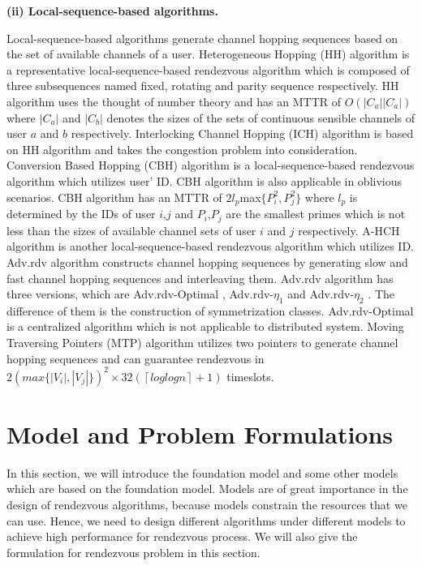 \documentclass[10pt, conference, letterpaper]{IEEEtran}
\begin{document}
\bfseries (ii) Local-sequence-based algorithms. \mdseries

Local-sequence-based algorithms generate channel hopping sequences based on the set of available channels of a user. Heterogeneous Hopping (HH)\cite{Shin2010A} algorithm is a representative local-sequence-based rendezvous algorithm which is composed of three subsequences named fixed, rotating and parity sequence respectively. HH algorithm uses the thought of number theory and has an MTTR of $O(|C_a||C_a|)$ where $|C_a|$ and $|C_b|$ denotes the sizes  of the sets of continuous sensible channels of user $a$ and $b$ respectively.  Interlocking Channel Hopping (ICH)\cite{Wu2013On} algorithm is based on HH algorithm and takes the congestion problem into consideration. Conversion Based Hopping (CBH)\cite{Gu2014Fully} algorithm is a local-sequence-based rendezvous algorithm which utilizes user' ID. CBH algorithm is also applicable in oblivious scenarios. CBH algorithm has an MTTR of $2l_p$max$\{P_i^2,P_j^2\}$ where $l_p$ is determined by the IDs of user $i$,$j$ and $P_i$,$P_j$ are the smallest  primes which is not less than the sizes of available channel sets of user $i$ and $j$ respectively. A-HCH \cite{Chen2014A} algorithm is another local-sequence-based rendezvous algorithm which utilizes ID. Adv.rdv algorithm constructs channel hopping sequences by generating slow and fast channel hopping sequences and interleaving them. Adv.rdv algorithm has three versions, which are Adv.rdv-Optimal \cite{Chen2014A}, Adv.rdv-$\eta_1$ \cite{Chen2014A} and Adv.rdv-$\eta_2$ \cite{Chen2014A}. The difference of them is the construction of symmetrization classes. Adv.rdv-Optimal is a centralized algorithm which is not applicable to distributed system. Moving Traversing Pointers (MTP) \cite{Gu2015Improved}algorithm utilizes two pointers to generate channel hopping sequences and can guarantee rendezvous in $2(max\{|V_i|,|V_j|\})^2\times32(\left \lceil loglog n\right \rceil +1)$ timeslots.

\section{Model and Problem Formulations}
In this section, we will introduce the foundation model and some other models which are based on the foundation model. Models are of great importance in the design of rendezvous algorithms, because models constrain the resources that we can use. Hence, we need to design different algorithms under different models to achieve high performance for rendezvous process. We will also give the formulation for rendezvous problem in this section.
\end{document}
